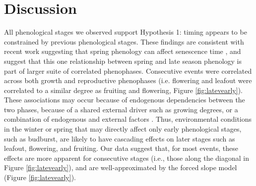 \documentclass{article}
\begin{document}
\section* {Discussion}
\par All phenological stages we observed support Hypothesis 1: timing appears to be constrained by previous phenological stages. These findings are consistent with recent work suggesting that spring phenology can affect senescence time \citep{keenan2015,liu2016}, and suggest that this one relationship between spring and late season phenology is part of larger suite of correlated phenophases. Consecutive events were correlated across both growth and reproductive phenophases (i.e. flowering and leafout were correlated to a similar degree as fruiting and flowering, Figure \ref{fig:latevearly}). These associations may occur because of endogenous dependencies between the two phases, because of a shared external driver such as growing degrees, or a combination of endogenous and external factors \citep{lechowicz1995}. Thus, environmental conditions in the winter or spring that may directly affect only early phenological stages, such as budburst, are likely to have cascading effects on later stages such as leafout, flowering, and fruiting. Our data suggest that, for most events, these effects are more apparent for consecutive stages (i.e., those along the diagonal in Figure \ref{fig:latevearly}), and are well-approximated by the forced slope model (Figure \ref{fig:latevearly}). %
\end{document}
